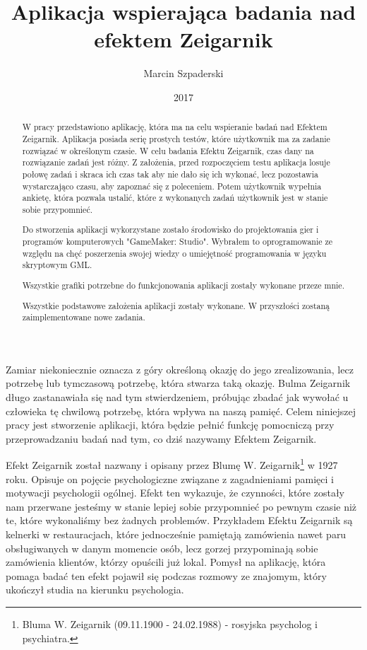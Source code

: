 \documentclass[openright]{xmgr}
\author   {Marcin Szpaderski}
\title    {Aplikacja wspierająca badania nad efektem Zeigarnik}
\date     {2017}
\begin{document}
\begin{abstract}
W pracy przedstawiono aplikację, która ma na celu wspieranie badań nad Efektem Zeigarnik. Aplikacja posiada serię prostych testów, które użytkownik ma za zadanie rozwiązać w określonym czasie. W celu badania Efektu Zeigarnik, czas dany na rozwiązanie zadań jest różny. Z założenia, przed rozpoczęciem testu aplikacja losuje połowę zadań i skraca ich czas tak aby nie dało się ich wykonać, lecz pozostawia wystarczająco czasu, aby zapoznać się z poleceniem. Potem użytkownik wypełnia ankietę, która pozwala ustalić, które z wykonanych zadań użytkownik jest w stanie sobie przypomnieć.

Do stworzenia aplikacji wykorzystane zostało środowisko do projektowania gier i programów komputerowych "GameMaker: Studio".  Wybrałem to oprogramowanie ze względu na chęć poszerzenia swojej wiedzy o umiejętność programowania w języku skryptowym GML. 

Wszystkie grafiki potrzebne do funkcjonowania aplikacji zostały wykonane przeze mnie.

Wszystkie podstawowe założenia aplikacji zostały wykonane. W przyszłości zostaną zaimplementowane nowe zadania.


\end{abstract}


\maketitle

\introduction

Zamiar niekoniecznie oznacza z góry określoną okazję do jego zrealizowania, lecz potrzebę lub tymczasową potrzebę, która stwarza taką okazję. Bulma Zeigarnik długo zastanawiała się nad tym stwierdzeniem, próbując zbadać jak wywołać u człowieka tę chwilową potrzebę, która wpływa na naszą pamięć. Celem niniejszej pracy jest stworzenie aplikacji, która będzie pełnić funkcję pomocniczą przy przeprowadzaniu badań nad tym, co dziś nazywamy Efektem Zeigarnik.

Efekt Zeigarnik został nazwany i opisany przez Blumę W. Zeigarnik\footnote{Bluma W. Zeigarnik (09.11.1900 - 24.02.1988) - rosyjska psycholog i psychiatra.} w 1927 roku. Opisuje on pojęcie psychologiczne związane z zagadnieniami pamięci i motywacji psychologii ogólnej. Efekt ten wykazuje, że czynności, które zostały nam przerwane jesteśmy w stanie lepiej sobie przypomnieć po pewnym czasie niż te, które wykonaliśmy bez żadnych problemów. Przykładem Efektu Zeigarnik są kelnerki w restauracjach, które jednocześnie pamiętają zamówienia nawet paru obsługiwanych w danym momencie osób, lecz gorzej przypominają sobie zamówienia klientów, którzy opuścili już lokal. Pomysł na aplikację, która pomaga badać ten efekt pojawił się podczas rozmowy ze znajomym, który ukończył studia na kierunku psychologia.
\end{document}
